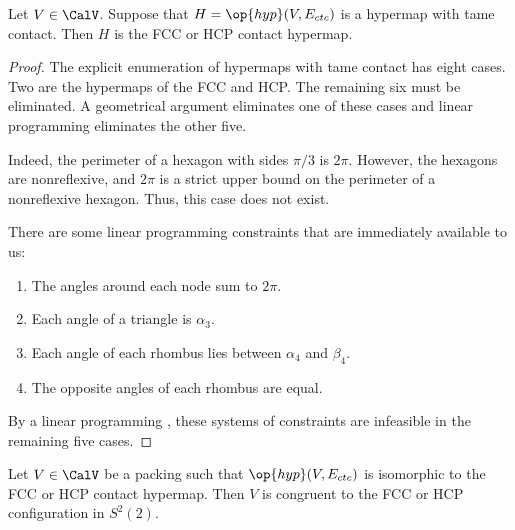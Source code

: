\begin{lemma}[]\label{lemma:fcc-ft} Let $V\in \CalV$.
  Suppose that $H=\op{hyp}(V,E_{ctc})$ is a hypermap with tame
  contact.  Then $H$ is the FCC or HCP contact hypermap.
\end{lemma}

\begin{proof} The explicit enumeration of hypermaps with tame
  contact has eight cases.  Two are the hypermaps of the
  FCC and HCP.  The remaining six must be eliminated.  
A geometrical argument  eliminates one of these cases and linear programming
eliminates the other five.

  Indeed, the perimeter of a hexagon with sides $\pi/3$
is $2\pi$.  However, the hexagons are nonreflexive, and $2\pi$ is a strict upper bound on the perimeter of a nonreflexive
hexagon.  Thus, this case does not exist.

\figCXFENOK %


There are some linear
  programming constraints that are immediately available to us:
\begin{enumerate}\wasitemize 
\item The angles around each node sum to $2\pi$.
\item Each angle of a triangle is $\alpha_3$.
\item Each angle of each rhombus lies between $\alpha_4$ and $\beta_4$.
\item The opposite angles of each rhombus are equal.
\end{enumerate}\wasitemize 
By a linear programming ,
these systems of constraints are infeasible in the remaining five cases.
\end{proof}


\begin{lemma}[]\label{lemma:kiss-fcc}
  Let $V\in \CalV$ be a packing such that $\op{hyp}(V,E_{ctc})$ is
  isomorphic to the FCC or HCP contact hypermap.  Then $V$ is
  congruent to the FCC or HCP configuration in $S^2(2)$.
\end{lemma}
%
%
%
%
%

